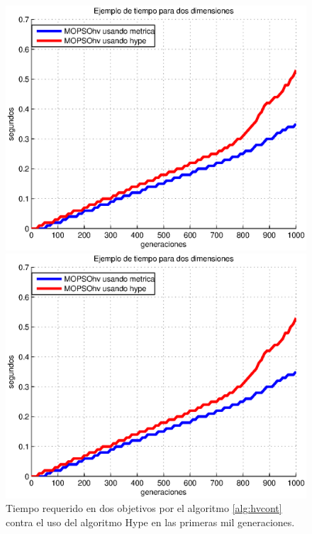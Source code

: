 \begin{enumerate}
\begin{itemize}
      \begin{figure}
\centering
  \begin{minipage}{0.45\textwidth}
    \centering
    \includegraphics[scale=0.5]{Cap3/time1.eps}
    \caption[Tiempo entre MOPSOhv en dos dimensiones (a)]{Tiempo requerido en dos objetivos por el algoritmo \ref{alg:hvcont} contra 
    el uso
	del algoritmo Hype en las primeras mil generaciones.}
    \label{fig:time1}
  \end{minipage}%
  \hspace{5mm}
  \begin{minipage}{0.4\textwidth}
    \centering
    \includegraphics[scale=0.5]{Cap3/time1.eps}

\end{minipage}
\end{figure}
\end{itemize}
\end{enumerate}
